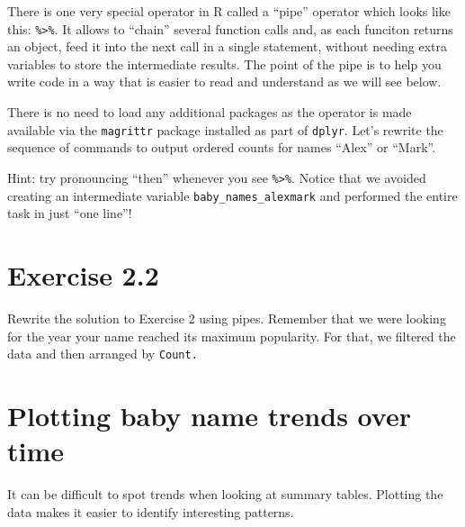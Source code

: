 \documentclass[]{book}
\newenvironment{Shaded}{\begin{snugshade}}{\end{snugshade}}
\newcommand{\KeywordTok}[1]{\textcolor[rgb]{0.13,0.29,0.53}{\textbf{#1}}}
\newcommand{\DecValTok}[1]{\textcolor[rgb]{0.00,0.00,0.81}{#1}}
\newcommand{\StringTok}[1]{\textcolor[rgb]{0.31,0.60,0.02}{#1}}
\newcommand{\OperatorTok}[1]{\textcolor[rgb]{0.81,0.36,0.00}{\textbf{#1}}}
\newcommand{\NormalTok}[1]{#1}
\begin{document}
There is one very special operator in R called a ``pipe'' operator which
looks like this: \texttt{\%\textgreater{}\%}. It allows to ``chain''
several function calls and, as each funciton returns an object, feed it
into the next call in a single statement, without needing extra
variables to store the intermediate results. The point of the pipe is to
help you write code in a way that is easier to read and understand as we
will see below.

There is no need to load any additional packages as the operator is made
available via the \texttt{magrittr} package installed as part of
\texttt{dplyr}. Let's rewrite the sequence of commands to output ordered
counts for names ``Alex'' or ``Mark''.

\begin{Shaded}
\end{Shaded}

Hint: try pronouncing ``then'' whenever you see
\texttt{\%\textgreater{}\%}. Notice that we avoided creating an
intermediate variable \texttt{baby\_names\_alexmark} and performed the
entire task in just ``one line''!

\section{Exercise 2.2}\label{exercise-2.2}

Rewrite the solution to Exercise 2 using pipes. Remember that we were
looking for the year your name reached its maximum popularity. For that,
we filtered the data and then arranged by \texttt{Count.}

\section{Plotting baby name trends over
time}\label{plotting-baby-name-trends-over-time}

It can be difficult to spot trends when looking at summary tables.
Plotting the data makes it easier to identify interesting patterns.
\end{document}

